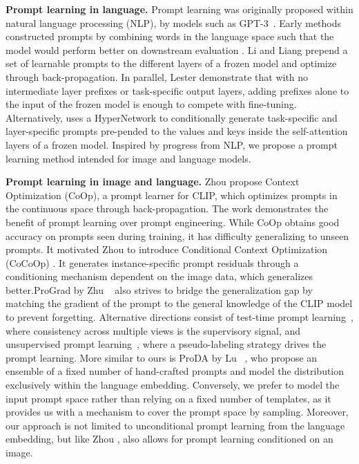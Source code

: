 \documentclass[10pt,twocolumn,letterpaper]{article}
\newcommand{\coop}{CoOp } \newcommand{\coopvpt}{CoOp+VPT } \newcommand{\cocoop}{CoCoOp } \newcommand{\cocoopvpt}{CoCoOp+VPT }
\begin{document}
\textbf{Prompt learning in language.} 
Prompt learning was originally proposed within natural language processing (NLP), by models such as GPT-3~\cite{brown2020language}. Early methods constructed prompts by combining words in the language space such that the model would perform better on downstream evaluation \cite{shin2020autoprompt,jiang2020can}.
Li and Liang \cite{li2021prefix} prepend a set of learnable prompts to the different layers of a frozen model and optimize through back-propagation.
In parallel, Lester \etal \cite{lester2021power} demonstrate that with no intermediate layer prefixes or task-specific output layers, adding prefixes alone to the input of the frozen model is enough to compete with fine-tuning.
Alternatively, \cite{he2022hyperprompt} 
uses a HyperNetwork to conditionally generate task-specific and layer-specific prompts pre-pended to the values and keys inside the self-attention layers of a frozen model. Inspired by progress from NLP, we propose a  prompt learning method intended for image and language models. 

\textbf{Prompt learning in image and language.} 
Zhou \etal \cite{zhou2022learning} propose Context Optimization (CoOp), a prompt learner for CLIP, which optimizes prompts in the continuous space through back-propagation. The work demonstrates the benefit of prompt learning over prompt engineering. While \coop obtains good accuracy on prompts seen during training, it has difficulty generalizing to unseen prompts. It motivated Zhou \etal to introduce Conditional Context Optimization (CoCoOp) \cite{zhou2022conditional}. It generates instance-specific prompt residuals through a conditioning mechanism dependent on the image data, which generalizes better.ProGrad by Zhu \etal~\cite{zhu2022prompt} also strives to bridge the generalization gap by matching the gradient of the prompt to the general knowledge of the CLIP model to prevent forgetting. 
Alternative directions consist of test-time prompt learning~\cite{testtimept_neurips22}, where consistency across multiple views is the supervisory signal, and unsupervised prompt learning~\cite{unsup_prompt22}, where a pseudo-labeling strategy drives the prompt learning.  More similar to ours is ProDA by Lu \etal~\cite{lu2022prompt}, who propose an ensemble of a fixed number of hand-crafted prompts and model the distribution exclusively within the language embedding. Conversely, we prefer to model the input prompt space rather than relying on a fixed number of templates, as it provides us with a mechanism to cover the prompt space by sampling. Moreover, our approach is not limited to unconditional prompt learning from the language embedding, but like Zhou \etal \cite{zhou2022conditional}, also allows for prompt learning conditioned on an image. 
\end{document}
